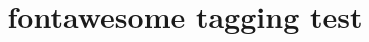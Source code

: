 \documentclass{article}
\title{fontawesome tagging test}
\begin{document}
\faAmbulance

\faFile
\end{document}
